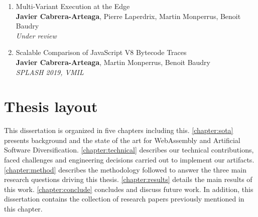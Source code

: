 \begin{enumerate}[label=\subscript{P}{{\arabic*}}]
    \item Multi-Variant Execution at the Edge \cite{MEWE}\\
    {\small\textbf{Javier Cabrera-Arteaga}, Pierre Laperdrix, Martin Monperrus, Benoit Baudry}\\
    \emph{Under review}\\
    \item Scalable Comparison of JavaScript V8 Bytecode Traces \cite{STRAC}\\
    {\small\textbf{Javier Cabrera-Arteaga}, Martin Monperrus, Benoit Baudry}\\
    \emph{SPLASH 2019, VMIL}\\
\end{enumerate}

\section*{Thesis layout}

This dissertation is organized in five chapters including this. \autoref{chapter:sota} presents background and the state of the art for WebAssembly and Artificial Software Diversification.
\autoref{chapter:technical} describes our technical contributions, faced challenges and engineering decisions carried out to implement our artifacts. \autoref{chapter:method} describes the methodology followed to answer the three main
research questions driving this thesis. \autoref{chapter:results} details the main results of this work. \autoref{chapter:conclude} concludes and discuss future work. 
In addition, this dissertation contains the collection of research papers previously mentioned in this chapter.